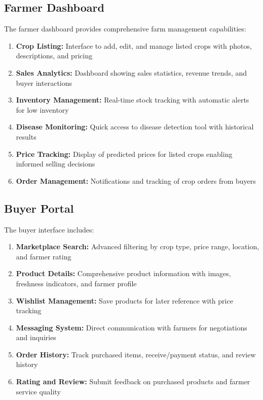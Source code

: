 \documentclass[12pt,a4paper]{report}
\begin{document}
\subsection{Farmer Dashboard}

The farmer dashboard provides comprehensive farm management capabilities:

\begin{enumerate}
    \item \textbf{Crop Listing:} Interface to add, edit, and manage listed crops with photos, descriptions, and pricing
    \item \textbf{Sales Analytics:} Dashboard showing sales statistics, revenue trends, and buyer interactions
    \item \textbf{Inventory Management:} Real-time stock tracking with automatic alerts for low inventory
    \item \textbf{Disease Monitoring:} Quick access to disease detection tool with historical results
    \item \textbf{Price Tracking:} Display of predicted prices for listed crops enabling informed selling decisions
    \item \textbf{Order Management:} Notifications and tracking of crop orders from buyers
\end{enumerate}

\subsection{Buyer Portal}

The buyer interface includes:

\begin{enumerate}
    \item \textbf{Marketplace Search:} Advanced filtering by crop type, price range, location, and farmer rating
    \item \textbf{Product Details:} Comprehensive product information with images, freshness indicators, and farmer profile
    \item \textbf{Wishlist Management:} Save products for later reference with price tracking
    \item \textbf{Messaging System:} Direct communication with farmers for negotiations and inquiries
    \item \textbf{Order History:} Track purchased items, receive/payment status, and review history
    \item \textbf{Rating and Review:} Submit feedback on purchased products and farmer service quality
\end{enumerate}
\end{document}
